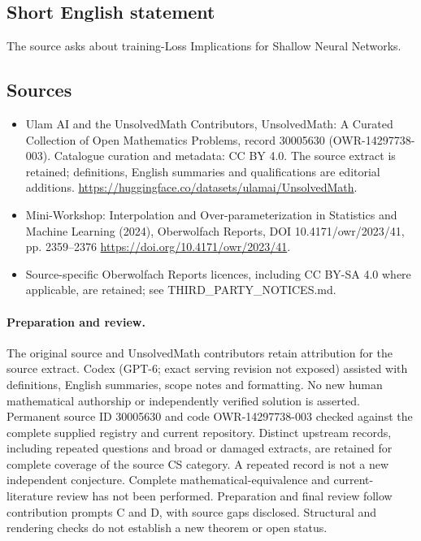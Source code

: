 \documentclass[11pt]{article}
\begin{document}
\subsection{Short English statement}
The source asks about training-Loss Implications for Shallow Neural Networks.
\subsection{Sources}
\begin{itemize}
\item[\hypertarget{source:30005630:1}{S1}] Ulam AI and the UnsolvedMath Contributors, UnsolvedMath: A Curated Collection of Open Mathematics Problems, record 30005630 (OWR-14297738-003). Catalogue curation and metadata: CC BY 4.0. The source extract is retained; definitions, English summaries and qualifications are editorial additions.
\url{https://huggingface.co/datasets/ulamai/UnsolvedMath}.
\item[\hypertarget{source:30005630:2}{S2}] Mini-Workshop: Interpolation and Over-parameterization in Statistics and Machine Learning​ (2024), Oberwolfach Reports, DOI 10.4171/owr/2023/41, pp. 2359--2376
\url{https://doi.org/10.4171/owr/2023/41}.
\item Source-specific Oberwolfach Reports licences, including CC BY-SA 4.0 where applicable, are retained; see THIRD\_PARTY\_NOTICES.md.
\end{itemize}
\paragraph{Preparation and review.}
The original source and UnsolvedMath contributors retain attribution for the source extract. Codex (GPT-6; exact serving revision not exposed) assisted with definitions, English summaries, scope notes and formatting. No new human mathematical authorship or independently verified solution is asserted. Permanent source ID 30005630 and code OWR-14297738-003 checked against the complete supplied registry and current repository. Distinct upstream records, including repeated questions and broad or damaged extracts, are retained for complete coverage of the source CS category. A repeated record is not a new independent conjecture. Complete mathematical-equivalence and current-literature review has not been performed. Preparation and final review follow contribution prompts C and D, with source gaps disclosed. Structural and rendering checks do not establish a new theorem or open status.
\label{end:30005630}
\end{document}
